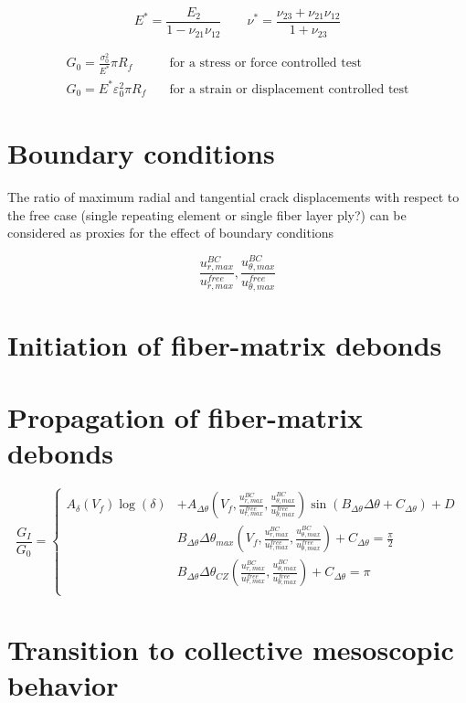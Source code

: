 \documentclass[review]{elsarticle}
\begin{document}
\begin{equation}\label{eq:equiplanestraintransiso}
E^{*}=\frac{E_{2}}{1-\nu_{21}\nu_{12}}\qquad\nu^{*}=\frac{\nu_{23}+\nu_{21}\nu_{12}}{1+\nu_{23}}
\end{equation}

\begin{equation}
\begin{split}
G_{0}=\frac{\sigma_{0}^{2}}{E^{*}}\pi R_{f}\quad&\text{for a stress or force controlled test}\\[5pt]
G_{0}=E^{*}\varepsilon_{0}^{2}\pi R_{f}\quad&\text{for a strain or displacement controlled test}
\end{split}
\end{equation}

\section{Boundary conditions}

The ratio of maximum radial and tangential crack displacements with respect to the free case (single repeating element or single fiber layer ply?) can be considered as proxies for the effect of boundary conditions

\begin{equation}
\frac{u^{BC}_{r,max}}{u^{free}_{r,max}},\frac{u^{BC}_{\theta,max}}{u^{free}_{\theta,max}}
\end{equation}

\section{Initiation of fiber-matrix debonds}

\section{Propagation of fiber-matrix debonds}

\begin{equation}
\frac{G_{I}}{G_{0}}=\begin{cases}
A_{\delta}\left(V_{f}\right)\log\left(\delta\right)&+A_{\Delta\theta}\left(V_{f},\frac{u^{BC}_{r,max}}{u^{free}_{r,max}},\frac{u^{BC}_{\theta,max}}{u^{free}_{\theta,max}}\right)\sin\left(B_{\Delta\theta}\Delta\theta+C_{\Delta\theta}\right)+D\\
&B_{\Delta\theta}\Delta\theta_{max}\left(V_{f},\frac{u^{BC}_{r,max}}{u^{free}_{r,max}},\frac{u^{BC}_{\theta,max}}{u^{free}_{\theta,max}}\right)+C_{\Delta\theta}=\frac{\pi}{2}\\
&B_{\Delta\theta}\Delta\theta_{CZ}\left(\frac{u^{BC}_{r,max}}{u^{free}_{r,max}},\frac{u^{BC}_{\theta,max}}{u^{free}_{\theta,max}}\right)+C_{\Delta\theta}=\pi\\
\end{cases}
\end{equation}

\section{Transition to collective mesoscopic behavior}
\end{document}

